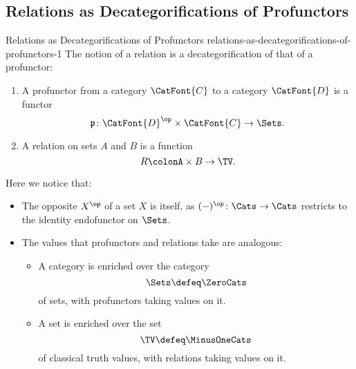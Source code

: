 \subsection{Relations as Decategorifications of Profunctors}\label{subsection-relations-as-decategorifications-of-profunctors}
\begin{remark}{Relations as Decategorifications of Profunctors \rmI}{relations-as-decategorifications-of-profunctors-1}%
    The notion of a relation is a decategorification of that of a profunctor:
    \begin{enumerate}
        \item\label{relations-as-decategorifications-of-profunctors-1-item-1}A profunctor from a category $\CatFont{C}$ to a category $\CatFont{D}$ is a functor
            \[%
                \mathfrak{p}%
                \colon%
                \CatFont{D}^{\op}\times\CatFont{C}%
                \to%
                \Sets.%
            \]%
        \item\label{relations-as-decategorifications-of-profunctors-1-item-2}A relation on sets $A$ and $B$ is a function%
            \[%
                R%
                \colon%
                A\times B%
                \to%
                \TV.%
            \]%
    \end{enumerate}
    Here we notice that:
    \begin{itemize}
        \item The opposite $X^{\op}$ of a set $X$ is itself, as $(-)^{\op}\colon\Cats\to\Cats$ restricts to the identity endofunctor on $\Sets$.
        \item The values that profunctors and relations take are analogous:
            \begin{itemize}
                \item A category is enriched over the category
                    \[
                        \Sets%
                        \defeq%
                        \ZeroCats%
                    \]%
                    of sets, with profunctors taking values on it.
                \item A set is enriched over the set
                    \[
                        \TV%
                        \defeq%
                        \MinusOneCats%
                    \]%
                    of classical truth values, with relations taking values on it.
            \end{itemize}
    \end{itemize}
\end{remark}

